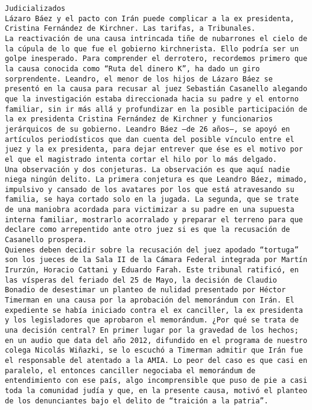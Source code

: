 \documentclass[11pt]{article}
\begin{document}
    \begin{Verbatim}[commandchars=\\\{\}]
﻿Judicializados
Lázaro Báez y el pacto con Irán puede complicar a la ex presidenta, Cristina Fernández de Kirchner. Las tarifas, a Tribunales.
La reactivación de una causa intrincada tiñe de nubarrones el cielo de la cúpula de lo que fue el gobierno kirchnerista. Ello podría ser un golpe inesperado. Para comprender el derrotero, recordemos primero que la causa conocida como “Ruta del dinero K”, ha dado un giro sorprendente. Leandro, el menor de los hijos de Lázaro Báez se presentó en la causa para recusar al juez Sebastián Casanello alegando que la investigación estaba direccionada hacia su padre y el entorno familiar, sin ir más allá y profundizar en la posible participación de la ex presidenta Cristina Fernández de Kirchner y funcionarios jerárquicos de su gobierno. Leandro Báez –de 26 años–, se apoyó en artículos periodísticos que dan cuenta del posible vínculo entre el juez y la ex presidenta, para dejar entrever que ése es el motivo por el que el magistrado intenta cortar el hilo por lo más delgado.
Una observación y dos conjeturas. La observación es que aquí nadie niega ningún delito. La primera conjetura es que Leandro Báez, mimado, impulsivo y cansado de los avatares por los que está atravesando su familia, se haya cortado solo en la jugada. La segunda, que se trate de una maniobra acordada para victimizar a su padre en una supuesta interna familiar, mostrarlo acorralado y preparar el terreno para que declare como arrepentido ante otro juez si es que la recusación de Casanello prospera.
Quienes deben decidir sobre la recusación del juez apodado “tortuga” son los jueces de la Sala II de la Cámara Federal integrada por Martín Irurzún, Horacio Cattani y Eduardo Farah. Este tribunal ratificó, en las vísperas del feriado del 25 de Mayo, la decisión de Claudio Bonadio de desestimar un planteo de nulidad presentado por Héctor Timerman en una causa por la aprobación del memorándum con Irán. El expediente se había iniciado contra el ex canciller, la ex presidenta y los legisladores que aprobaron el memorándum. ¿Por qué se trata de una decisión central? En primer lugar por la gravedad de los hechos; en un audio que data del año 2012, difundido en el programa de nuestro colega Nicolás Wiñazki, se lo escuchó a Timerman admitir que Irán fue el responsable del atentado a la AMIA. Lo peor del caso es que casi en paralelo, el entonces canciller negociaba el memorándum de entendimiento con ese país, algo incomprensible que puso de pie a casi toda la comunidad judía y que, en la presente causa, motivó el planteo de los denunciantes bajo el delito de “traición a la patria”.

\end{Verbatim}
\end{document}
